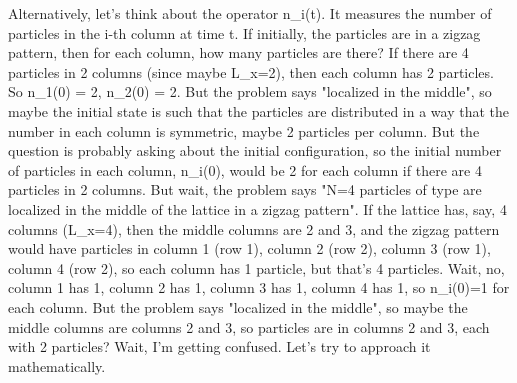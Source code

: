 Alternatively, let's think about the operator n_i(t). It measures the number of particles in the i-th column at time t. If initially, the particles are in a zigzag pattern, then for each column, how many particles are there? If there are 4 particles in 2 columns (since maybe L_x=2), then each column has 2 particles. So n_1(0) = 2, n_2(0) = 2. But the problem says "localized in the middle", so maybe the initial state is such that the particles are distributed in a way that the number in each column is symmetric, maybe 2 particles per column. But the question is probably asking about the initial configuration, so the initial number of particles in each column, n_i(0), would be 2 for each column if there are 4 particles in 2 columns. But wait, the problem says "N=4 particles of type are localized in the middle of the lattice in a zigzag pattern". If the lattice has, say, 4 columns (L_x=4), then the middle columns are 2 and 3, and the zigzag pattern would have particles in column 1 (row 1), column 2 (row 2), column 3 (row 1), column 4 (row 2), so each column has 1 particle, but that's 4 particles. Wait, no, column 1 has 1, column 2 has 1, column 3 has 1, column 4 has 1, so n_i(0)=1 for each column. But the problem says "localized in the middle", so maybe the middle columns are columns 2 and 3, so particles are in columns 2 and 3, each with 2 particles? Wait, I'm getting confused. Let's try to approach it mathematically.

